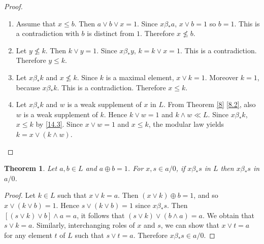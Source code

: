 \documentclass[a4paper,12pt]{article}
\newtheorem{theorem}{Theorem}[section]
\numberwithin{equation}{section}
\begin{document}
\begin{proof}
  \begin{enumerate}
    \item
      Assume that $ x \leq b $. Then $ a \vee b \vee x = 1 $. Since $ x \beta_* a $, $ x \vee b = 1 $ so $ b = 1 $. 
      This is a contradiction with $ b $ is distinct from $ 1 $. 
      Therefore $ x \not\le b $.
    \item
      Let $ y \not\le k $. Then $ k \vee y = 1 $. Since $ x \beta_* y $, $ k = k \vee x = 1 $. This is a contradiction. 
      Therefore $ y \leq k $.
    \item
      Let $ x \beta_* k $ and $ x \not\le k $. Since $ k $ is a maximal element, $ x \vee k = 1 $. Moreover $ k = 1 $, 
      because $ x \beta_* k $. This is a contradiction. Therefore $ x \leq k $.
    \item
      Let $ x \beta_* k $ and $ w $ is a weak supplement of $ x $ in $ L $. From Theorem \ref{8} \ref{8.2}, 
      also $ w $ is a weak supplement of $ k $. Hence $ k \vee w = 1 $ and $ k \wedge w \ll L $. 
      Since $ x \beta_* k $, $ x \leq k $ by \ref{14.3}. Since $ x \vee w = 1 $ 
      and $ x \leq k $, the modular law yields $ k = x \vee ( k \wedge w ) $.
  \end{enumerate}
\end{proof}


\begin{theorem}\label{15}
  Let $ a, b \in L $ and $ a \oplus b = 1 $. For $ x,s \in a/0 $, if $ x \beta_* s $ in $ L $ then $ x \beta_* s $ in $ a/0 $.
\end{theorem}

\begin{proof}
  Let $ k \in L $ such that $ x \vee k = a $. Then $ (x \vee k ) \oplus b = 1 $, and so $ x \vee ( k \vee b ) = 1 $. 
  Hence $ s \vee ( k \vee b ) = 1 $ since $ x \beta_* s $. Then $ \left[ (s \vee k ) \vee b \right] \wedge a = a $, 
  it follows that $ ( s \vee k ) \vee ( b \wedge a ) = a $. We obtain that $ s \vee k = a $. Similarly, interchanging 
  roles of $ x $ and $ s $, we can show that $ x \vee t = a $ for any element $ t $ of $ L $ such that $ s \vee t = a $. 
  Therefore $ x \beta_* s \in a/0 $.
\end{proof}
\end{document}
